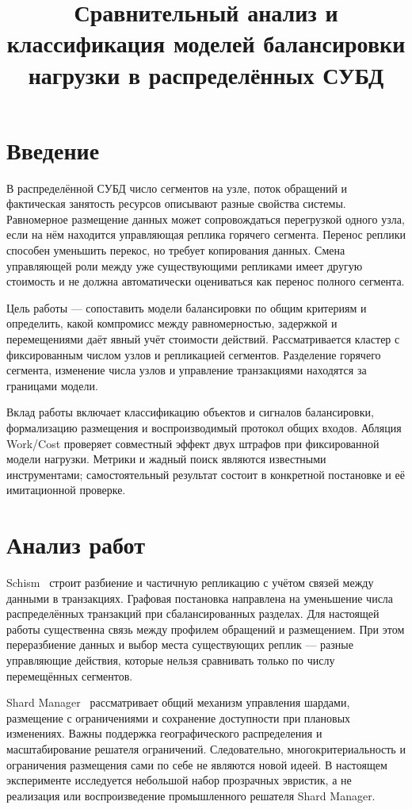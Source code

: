 \documentclass{misisarticle}
\title{Сравнительный анализ и классификация моделей балансировки нагрузки в распределённых СУБД}
\begin{document}
\maketitle

\section{Введение}
В распределённой СУБД число сегментов на узле, поток обращений и фактическая занятость ресурсов описывают разные свойства системы. Равномерное размещение данных может сопровождаться перегрузкой одного узла, если на нём находится управляющая реплика горячего сегмента. Перенос реплики способен уменьшить перекос, но требует копирования данных. Смена управляющей роли между уже существующими репликами имеет другую стоимость и не должна автоматически оцениваться как перенос полного сегмента.

Цель работы --- сопоставить модели балансировки по общим критериям и определить, какой компромисс между равномерностью, задержкой и перемещениями даёт явный учёт стоимости действий. Рассматривается кластер с фиксированным числом узлов и репликацией сегментов. Разделение горячего сегмента, изменение числа узлов и управление транзакциями находятся за границами модели.

Вклад работы включает классификацию объектов и сигналов балансировки, формализацию размещения и воспроизводимый протокол общих входов. Абляция Work/Cost проверяет совместный эффект двух штрафов при фиксированной модели нагрузки. Метрики и жадный поиск являются известными инструментами; самостоятельный результат состоит в конкретной постановке и её имитационной проверке.

\section{Анализ работ}
Schism~\cite{curino2010} строит разбиение и частичную репликацию с учётом связей между данными в транзакциях. Графовая постановка направлена на уменьшение числа распределённых транзакций при сбалансированных разделах. Для настоящей работы существенна связь между профилем обращений и размещением. При этом переразбиение данных и выбор места существующих реплик --- разные управляющие действия, которые нельзя сравнивать только по числу перемещённых сегментов.

Shard Manager~\cite{lee2021} рассматривает общий механизм управления шардами, размещение с ограничениями и сохранение доступности при плановых изменениях. Важны поддержка географического распределения и масштабирование решателя ограничений. Следовательно, многокритериальность и ограничения размещения сами по себе не являются новой идеей. В настоящем эксперименте исследуется небольшой набор прозрачных эвристик, а не реализация или воспроизведение промышленного решателя Shard Manager.
\end{document}
